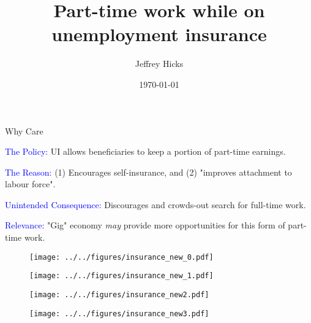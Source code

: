 \documentclass{beamer}
\title{Part-time work while on unemployment insurance}
\author{Jeffrey Hicks \inst{1} }
\date[]{\today}
\institute{\inst{1} UBC Economics 
}
\newenvironment{widelist}{\itemize\addtolength{\itemsep}{16pt}}{\enditemize}
\begin{document}
	{
		\begin{frame}[noframenumbering]
		\titlepage %
	\end{frame}
}

\begin{frame}{Why Care}


\begin{widelist}
	\item <1-> \textcolor{blue}{The Policy:} UI allows beneficiaries to keep a portion of part-time earnings.
	\item <2-> \textcolor{blue}{The Reason:} (1) Encourages self-insurance, and (2) "improves attachment to labour force".
	\item <3-> \textcolor{blue}{Unintended Consequence:} Discourages and crowds-out search for full-time work.
	\item <4-> \textcolor{blue}{Relevance:} "Gig" economy \textit{may} provide more opportunities for this form of part-time work.
\end{widelist}
\end{frame}


\begin{frame}
\begin{figure}
	\texttt{[image: ../../figures/insurance\_new\_0.pdf]}
\end{figure}
\end{frame}

\begin{frame}[noframenumbering]
\begin{figure}
\texttt{[image: ../../figures/insurance\_new\_1.pdf]}
\end{figure}
\end{frame}

\begin{frame}[noframenumbering]
\begin{figure}
\texttt{[image: ../../figures/insurance\_new2.pdf]}
\end{figure}
\end{frame}

\begin{frame}[noframenumbering]
\begin{figure}
	\texttt{[image: ../../figures/insurance\_new3.pdf]}
\end{figure}
\end{frame}
\end{document}
